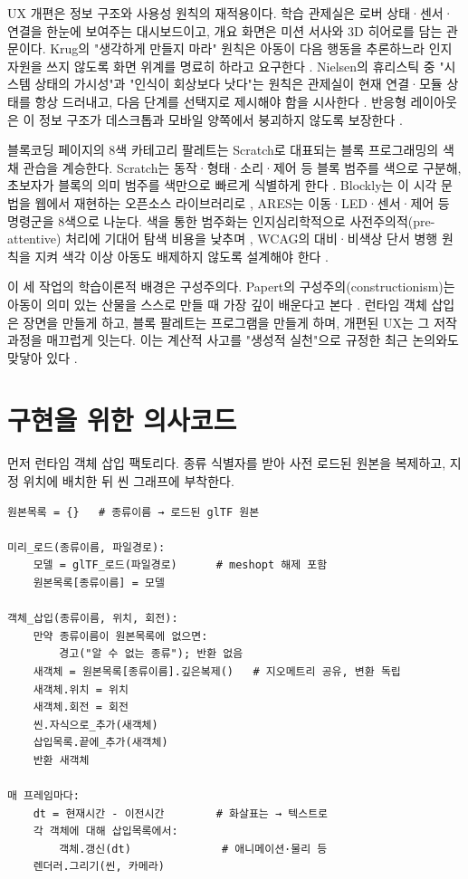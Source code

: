UX 개편은 정보 구조와 사용성 원칙의 재적용이다. 학습 관제실은 로버 상태·센서·연결을 한눈에 보여주는 대시보드이고, 개요 화면은 미션 서사와 3D 히어로를 담는 관문이다. Krug의 "생각하게 만들지 마라" 원칙은 아동이 다음 행동을 추론하느라 인지 자원을 쓰지 않도록 화면 위계를 명료히 하라고 요구한다 \cite{krug2014dontmakemethink}. Nielsen의 휴리스틱 중 "시스템 상태의 가시성"과 "인식이 회상보다 낫다"는 원칙은 관제실이 현재 연결·모듈 상태를 항상 드러내고, 다음 단계를 선택지로 제시해야 함을 시사한다 \cite{nielsen1994heuristics, nielsen1993usability}. 반응형 레이아웃은 이 정보 구조가 데스크톱과 모바일 양쪽에서 붕괴하지 않도록 보장한다 \cite{marcotte2010responsive, wcag21}.

블록코딩 페이지의 8색 카테고리 팔레트는 Scratch로 대표되는 블록 프로그래밍의 색채 관습을 계승한다. Scratch는 동작·형태·소리·제어 등 블록 범주를 색으로 구분해, 초보자가 블록의 의미 범주를 색만으로 빠르게 식별하게 한다 \cite{resnick2009scratch, maloney2010scratch}. Blockly는 이 시각 문법을 웹에서 재현하는 오픈소스 라이브러리로 \cite{blockly}, ARES는 이동·LED·센서·제어 등 명령군을 8색으로 나눈다. 색을 통한 범주화는 인지심리학적으로 사전주의적(pre-attentive) 처리에 기대어 탐색 비용을 낮추며 \cite{norman2013design}, WCAG의 대비·비색상 단서 병행 원칙을 지켜 색각 이상 아동도 배제하지 않도록 설계해야 한다 \cite{wcag21}.

이 세 작업의 학습이론적 배경은 구성주의다. Papert의 구성주의(constructionism)는 아동이 의미 있는 산물을 스스로 만들 때 가장 깊이 배운다고 본다 \cite{papert1980}. 런타임 객체 삽입은 장면을 만들게 하고, 블록 팔레트는 프로그램을 만들게 하며, 개편된 UX는 그 저작 과정을 매끄럽게 잇는다. 이는 계산적 사고를 "생성적 실천"으로 규정한 최근 논의와도 맞닿아 있다 \cite{brennan2012ct, grover2013ct}.

\section{구현을 위한 의사코드}

먼저 런타임 객체 삽입 팩토리다. 종류 식별자를 받아 사전 로드된 원본을 복제하고, 지정 위치에 배치한 뒤 씬 그래프에 부착한다.

\begin{verbatim}
원본목록 = {}   # 종류이름 → 로드된 glTF 원본

미리_로드(종류이름, 파일경로):
    모델 = glTF_로드(파일경로)      # meshopt 해제 포함
    원본목록[종류이름] = 모델

객체_삽입(종류이름, 위치, 회전):
    만약 종류이름이 원본목록에 없으면:
        경고("알 수 없는 종류"); 반환 없음
    새객체 = 원본목록[종류이름].깊은복제()   # 지오메트리 공유, 변환 독립
    새객체.위치 = 위치
    새객체.회전 = 회전
    씬.자식으로_추가(새객체)
    삽입목록.끝에_추가(새객체)
    반환 새객체

매 프레임마다:
    dt = 현재시간 - 이전시간        # 화살표는 → 텍스트로
    각 객체에 대해 삽입목록에서:
        객체.갱신(dt)              # 애니메이션·물리 등
    렌더러.그리기(씬, 카메라)
\end{verbatim}

